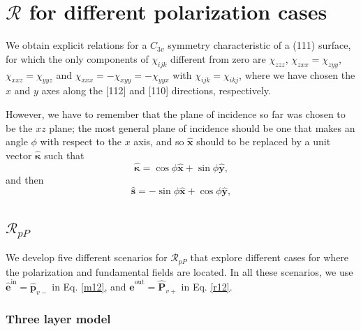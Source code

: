 \documentclass[10pt]{article}
\begin{document}
\section{\texorpdfstring{$\mathcal{R}$}{R} for different polarization cases}

We obtain explicit relations for a $C_{3v}$ symmetry characteristic of a (111)
surface, for which the only components of $\chi_{ijk}$ different from zero are
$\chi_{zzz}$, $\chi_{zxx}=\chi_{zyy}$, $\chi_{xxz}=\chi_{yyz}$ and
$\chi_{xxx}=-\chi_{xyy}=-\chi_{yyx}$ with $\chi_{ijk}=\chi_{ikj}$, where we
have chosen the $x$ and $y$ axes along the [112] and [110] directions,
respectively.

However, we have to remember that the plane of incidence so far was chosen to
be the $xz$ plane; the most general plane of incidence should be one that makes
an angle $\phi$ with respect to the $x$ axis, and so $\hat{\mathbf{x}}$ should
to be replaced by a unit vector $\hat{\mathbf{\kappa}}$ such that
\begin{equation}\label{mc1}
\hat{\boldsymbol{\kappa}}
= \cos\phi\hat{\mathbf{x}} + \sin\phi\hat{\mathbf{y}},
\end{equation}
and then
\begin{equation}\label{mc2}
\hat{\mathbf{s}} = -\sin\phi\hat{\mathbf{x}} + \cos\phi\hat{\mathbf{y}},
\end{equation}

\subsection{\texorpdfstring{$\mathcal{R}_{pP}$}{RpP}}

We develop five different scenarios for $\mathcal{R}_{pP}$ that explore
different cases for where the polarization and fundamental fields are located.
In all these scenarios, we use
$\hat{\mathbf{e}}^{\mathrm{in}}=\hat{\mathbf{p}}_{v-}$ in Eq. \eqref{m12}, and
$\hat{\mathbf{e}}^{\mathrm{out}}=\hat{\mathbf{P}}_{v+}$ in Eq.
\eqref{r12}.

\subsubsection{Three layer model}
\end{document}
